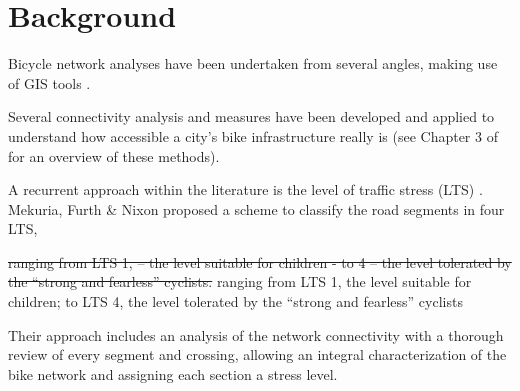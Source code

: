 \documentclass[information,article,submit,moreauthors,pdftex,10pt,a4paper]{mdpi}
\theoremstyle{mdpi}
\newcounter{re}
\theoremstyle{mdpidefinition}
\begin{document}
\section{Background} \label{background}

Bicycle network analyses have been undertaken from several angles, making use of GIS tools \cite{Manum2013,Cooper2017}.

\begin{mycolorbox}[colback=yellow]
Several connectivity analysis and measures have been developed and applied to understand how accessible a city's bike infrastructure really is (see Chapter 3 of \cite{Twadell2018} for an overview of these methods).
\end{mycolorbox}

A recurrent approach within the literature is the level of traffic stress (LTS) \cite{Sorton1994,Geller2006}. Mekuria, Furth \& Nixon \cite{Mekuria2012b} proposed a scheme to classify the road segments in four LTS, 
\begin{mycolorbox}[colback=yellow]
\sout{ranging from LTS 1, – the level suitable for children - to 4 – the level tolerated by the “strong and fearless” cyclists.} ranging from LTS 1, the level suitable for children; to LTS 4, the level tolerated by the “strong and fearless” cyclists \cite{Dill2016}
\end{mycolorbox}
Their approach includes an analysis of the network connectivity with a thorough review of every segment and crossing, allowing an integral characterization of the bike network and assigning each section a stress level. 
\end{document}
